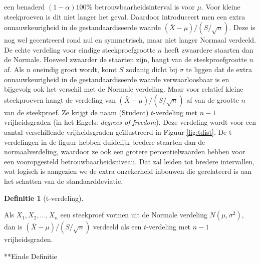 \documentclass[
  12pt,dutch,coursenotes]{book}
\theoremstyle{definition}
\newtheorem{definition}{Definitie}[chapter]
\theoremstyle{definition}
\theoremstyle{definition}
\theoremstyle{remark}
\begin{document}
een benaderd \((1- \alpha)100\%\) betrouwbaarheidsinterval is voor \(\mu\). Voor
kleine steekproeven is dit niet langer het geval. Daardoor introduceert men
een extra onnauwkeurigheid in de gestandaardiseerde waarde \({(\bar{X} - \mu)}/{(S/\sqrt{n})}\). Deze is nog wel gecentreerd rond nul en symmetrisch, maar niet langer Normaal verdeeld. De echte verdeling voor eindige
steekproefgrootte \(n\) heeft zwaardere staarten dan de Normale. Hoeveel
zwaarder de staarten zijn, hangt van de steekproefgrootte \(n\) af. Als \(n\)
oneindig groot wordt, komt \(S\) zodanig dicht bij \(\sigma\) te liggen dat de
extra onnauwkeurigheid in de gestandaardiseerde waarde verwaarloosbaar is en
bijgevolg ook het verschil met de Normale verdeling. Maar voor relatief
kleine steekproeven hangt de verdeling van \({(\bar{X} - \mu)}/({S/\sqrt{n}})\) af van de grootte \(n\) van de steekproef. Ze krijgt de naam (Student) \(t\)-verdeling met \(n-1\) vrijheidsgraden (in het Engels: \emph{degrees of freedom}). Deze verdeling wordt voor een aantal verschillende vrijheidsgraden geïllustreerd in Figuur \ref{fig:tdist}.
De t-verdelingen in de figuur hebben duidelijk bredere staarten dan de normaalverdeling, waardoor ze ook een grotere percentielwaarden hebben voor een vooropgesteld betrouwbaarheidsniveau.
Dat zal leiden tot bredere intervallen, wat logisch is aangezien we de extra onzekerheid inbouwen die gerelateerd is aan het schatten van de standaarddeviatie.

\begin{definition}[t-verdeling]
\protect\hypertarget{def:unnamed-chunk-150}{}{\label{def:unnamed-chunk-150} \iffalse (t-verdeling) \fi{} }
\end{definition}
Als \(X_1, X_2, ..., X_n\) een steekproef vormen uit de Normale verdeling \(N(\mu, \sigma^2)\), dan is \((\bar{X} - \mu)/(S/\sqrt{n})\) verdeeld als een \(t\)-verdeling met \(n-1\) vrijheidsgraden.

**Einde Definitie
\end{document}
